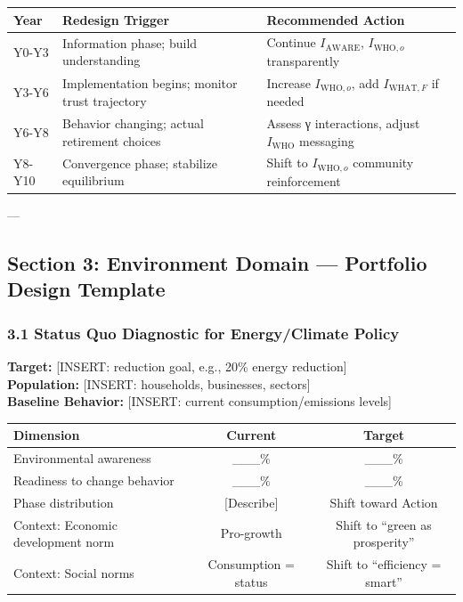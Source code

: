 \begin{center}
\begin{tabular}{@{}lll@{}}
\toprule
\textbf{Year} & \textbf{Redesign Trigger} & \textbf{Recommended Action} \\
\midrule
Y0-Y3 & Information phase; build understanding & Continue $I_{\text{AWARE}}$, $I_{\text{WHO},o}$ transparently \\
Y3-Y6 & Implementation begins; monitor trust trajectory & Increase $I_{\text{WHO},o}$, add $I_{\text{WHAT},F}$ if needed \\
Y6-Y8 & Behavior changing; actual retirement choices & Assess γ interactions, adjust $I_{\text{WHO}}$ messaging \\
Y8-Y10 & Convergence phase; stabilize equilibrium & Shift to $I_{\text{WHO},o}$ community reinforcement \\
\midrule
\end{tabular}
\end{center}

---


\subsection*{Section 3: Environment Domain — Portfolio Design Template}

\subsubsection*{3.1 Status Quo Diagnostic for Energy/Climate Policy}

\textbf{Target:} [INSERT: reduction goal, e.g., 20\% energy reduction] \\
\textbf{Population:} [INSERT: households, businesses, sectors] \\
\textbf{Baseline Behavior:} [INSERT: current consumption/emissions levels]

\begin{center}
\begin{tabular}{@{}lcc@{}}
\toprule
\textbf{Dimension} & \textbf{Current} & \textbf{Target} \\
\midrule
Environmental awareness & \_\_\_\% & \_\_\_\% \\
Readiness to change behavior & \_\_\_\% & \_\_\_\% \\
Phase distribution & [Describe] & Shift toward Action \\
Context: Economic development norm & Pro-growth & Shift to ``green as prosperity'' \\
Context: Social norms & Consumption = status & Shift to ``efficiency = smart'' \\
\midrule
\end{tabular}
\end{center}

